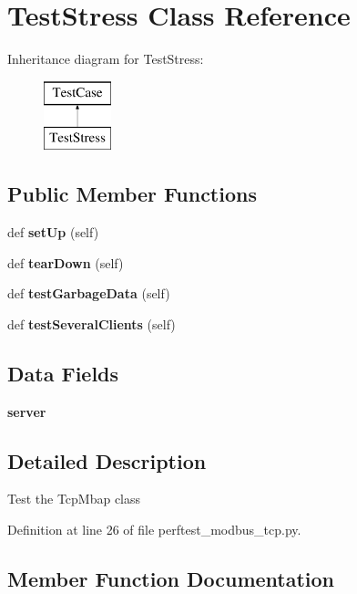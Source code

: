 \section{Test\+Stress Class Reference}
\label{classtests_1_1perftest__modbus__tcp_1_1_test_stress}
Inheritance diagram for Test\+Stress\+:\begin{figure}[H]
\begin{center}
\leavevmode
\includegraphics[height=2.000000cm]{classtests_1_1perftest__modbus__tcp_1_1_test_stress}
\end{center}
\end{figure}
\subsection*{Public Member Functions}
\begin{DoxyCompactItemize}
\item 
def {\bf set\+Up} (self)
\item 
def {\bf tear\+Down} (self)
\item 
def {\bf test\+Garbage\+Data} (self)
\item 
def {\bf test\+Several\+Clients} (self)
\end{DoxyCompactItemize}
\subsection*{Data Fields}
\begin{DoxyCompactItemize}
\item 
{\bf server}
\end{DoxyCompactItemize}


\subsection{Detailed Description}
\begin{DoxyVerb}Test the TcpMbap class\end{DoxyVerb}
 

Definition at line 26 of file perftest\+\_\+modbus\+\_\+tcp.\+py.



\subsection{Member Function Documentation}
